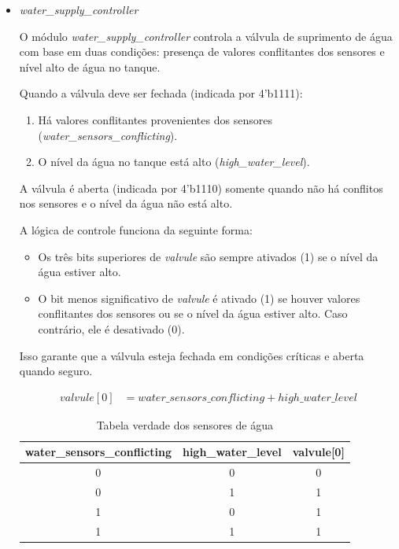 \documentclass[
	article,			%
	11pt,				%
	oneside,			%
	a4paper,			%
	english,			%
	brazil,				%
	sumario=tradicional
	]{abntex2}
\begin{document}
\begin{itemize}
    \item \textit{water\_supply\_controller}

O módulo \textit{water\_supply\_controller} controla a válvula de suprimento de água com base em duas condições: presença de valores conflitantes dos sensores e nível alto de água no tanque.

Quando a válvula deve ser fechada (indicada por 4'b1111):

\begin{enumerate}
    \item Há valores conflitantes provenientes dos sensores (\textit{water\_sensors\_conflicting}).

    \item O nível da água no tanque está alto (\textit{high\_water\_level}).
\end{enumerate}


A válvula é aberta (indicada por 4'b1110) somente quando não há conflitos nos sensores e o nível da água não está alto.

A lógica de controle funciona da seguinte forma:

\begin{itemize}
    \item Os três bits superiores de \textit{valvule} são sempre ativados (1) se o nível da água estiver alto.
    \item O bit menos significativo de \textit{valvule} é ativado (1) se houver valores conflitantes dos sensores ou se o nível da água estiver alto. Caso contrário, ele é desativado (0).
\end{itemize}

Isso garante que a válvula esteja fechada em condições críticas e aberta quando seguro.

\begin{equation}
\begin{split}
valvule[0] &= water\_sensors\_conflicting + high\_water\_level
\label{math:valvule}
\end{split}
\end{equation}

\begin{table}[H]
\centering
\begin{tabular}{|c|c|c|}
\hline
water\_sensors\_conflicting & high\_water\_level & valvule[0] \\ \hline
0                           & 0                  & 0          \\ \hline
0                           & 1                  & 1          \\ \hline
1                           & 0                  & 1          \\ \hline
1                           & 1                  & 1          \\ \hline
\end{tabular}
\caption{Tabela verdade dos sensores de água}
\label{tab:sensors}
\end{table}
    
\end{itemize}
\end{document}
